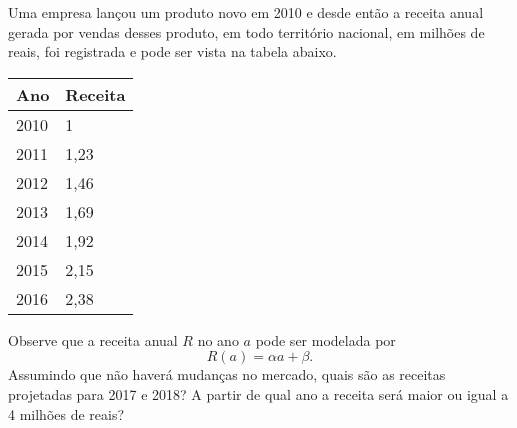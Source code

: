 Uma empresa lançou um produto novo em 2010 e desde então a receita anual gerada por vendas desses produto,
em todo território nacional, em milhões de reais, foi registrada e pode ser vista na tabela abaixo.
\begin{center}
\begin{tabular}{|l|l|}\hline
	Ano & Receita\\\hline\hline
	2010 & 1\\
	2011 & 1,23\\
	2012 & 1,46\\
	2013 & 1,69\\
	2014 & 1,92\\
	2015 & 2,15\\
	2016 & 2,38\\\hline
\end{tabular}
\end{center}
Observe que a receita anual $R$ no ano $a$ pode ser modelada por 
\[
	R(a)=\alpha a+\beta.
\]
Assumindo que não haverá mudanças no mercado, quais são as receitas projetadas para 2017 e 2018?
A partir de qual ano a receita será maior ou igual a 4 milhões de reais?
